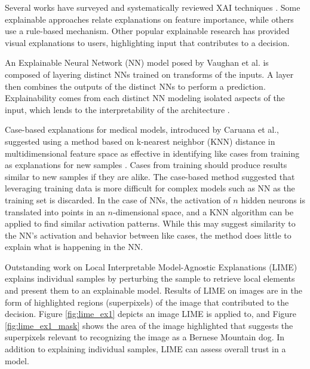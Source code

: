 Several works have surveyed and systematically reviewed XAI techniques
\cite{guidotti2018survey, vilone2020explainable, arrieta2020explainable}. Some
explainable approaches relate explanations on feature importance, while others
use a rule-based mechanism. Other popular explainable research has provided
visual explanations to users, highlighting input that contributes to a decision.

An Explainable Neural Network (NN) model posed by Vaughan et al. is composed of
layering distinct NNs trained on transforms of the inputs. A layer then combines
the outputs of the distinct NNs to perform a prediction. Explainability comes
from each distinct NN modeling isolated aspects of the input, which lends to the
interpretability of the architecture \cite{vaughan2018explainable}.


Case-based explanations for medical models, introduced by Caruana et al.,
suggested using a method based on k-nearest neighbor (KNN) distance in
multidimensional feature space as effective in identifying like cases from
training as explanations for new samples \cite{Caruana1999CasebasedEO}. Cases
from training should produce results similar to new samples if they are alike.
The case-based method suggested that leveraging training data is more difficult
for complex models such as NN as the training set is discarded. In the case of
NNs, the activation of $n$ hidden neurons is translated into points in an
$n$-dimensional space, and a KNN algorithm can be applied to find similar
activation patterns. While this may suggest similarity to the NN's activation
and behavior between like cases, the method does little to explain what is
happening in the NN.

Outstanding work on Local Interpretable Model-Agnostic Explanations (LIME)
explains individual samples by perturbing the sample to retrieve local elements
and present them to an explainable model. Results of LIME on images are in the
form of highlighted regions (superpixels) of the image that contributed to the
decision. Figure \ref{fig:lime_ex1} depicts an image LIME is applied to, and
Figure \ref{fig:lime_ex1_mask} shows the area of the image highlighted that
suggests the superpixels relevant to recognizing the image as a Bernese Mountain
dog. In addition to explaining individual samples, LIME can assess overall trust
in a model\cite{ribeiro2016should}.


